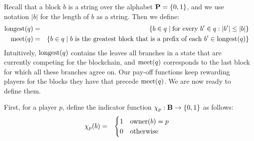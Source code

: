 Recall that a block $b$ is a string over the alphabet $\mathbf{P} = \{0,1\}$, and we use notation $|b|$ for the length of $b$ as a string. 
Then we define: 
\begin{eqnarray*}
{\text{\rm longest}}(q) & = & \{ b \in q \mid \text{for every } b' \in q: |b'| \leq |b|\}\\
\text{\rm meet}(q) & = & \{b \in q \mid b \text{ is the greatest block that is a prefix of each } b' \in {\text{\rm longest}}(q) \}
\end{eqnarray*}
Intuitively, ${\text{\rm longest}}(q)$ contains the leaves all branches in a state that are currently competing for the blockchain, and $\text{\rm meet}(q)$ corresponds to the last block for which all these branches agree on. Our pay-off functions keep rewarding players for the blocks they have that 
precede $\text{\rm meet}(q)$. We are now ready to define them. 

First, for a player $p$, define the indicator function $\chi_p : \mathbf{B} \to \{0,1\}$ as follows:
\begin{eqnarray*}
\chi_p(b) & = & 
\begin{cases}
1 & \text{\rm owner}(b) = p\\
0 & \text{otherwise}
\end{cases}
\end{eqnarray*}


